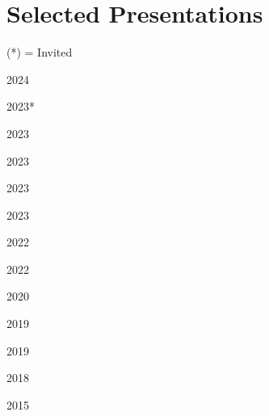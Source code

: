 \documentclass[12pt,letterpaper]{report}
\begin{document}
    \section*{Selected Presentations}
    \small{(*) = Invited} \\

    \begin{tablist}
        \item[2024] \tab{}
        \item[2023*] \tab{}
        \item[2023] \tab{}
        \item[2023] \tab{}
        \item[2023] \tab{}
        \item[2023] \tab{}
        \item[2022] \tab{}
        \item[2022] \tab{}
        \item[2020] \tab{}
        \item[2019] \tab{}
        \item[2019] \tab{}
        \item[2018] \tab{}
        \item[2015] \tab{}
    \end{tablist}


    
    
\end{document}
